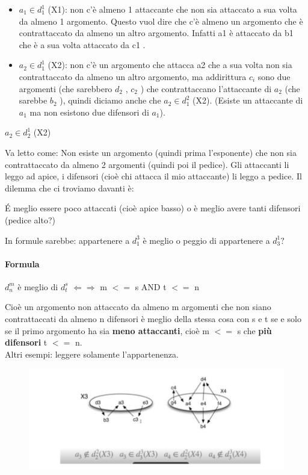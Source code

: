 \begin{itemize}
    \item $a_1 \in d^1_1$ (X1): non c'è almeno 1 attaccante che non sia
          attaccato a sua volta da almeno 1 argomento. Questo vuol dire che c'è
          almeno un argomento che è contrattaccato da almeno un altro argomento.
          Infatti a1 è attaccato da b1 che è a sua volta attaccato da c1 .
    \item $a_2 \in d^1_1$ (X2): non c'è un argomento che attacca a2 che a
          sua volta non sia contrattaccato da almeno un altro argomento, ma
          addirittura $c_i$ sono due argomenti (che sarebbero $d_2$ , $c_2$ ) che
          contrattaccano l'attaccante di $a_2$ (che sarebbe $b_2$ ), quindi
          diciamo anche che $a_2 \in d^2_1$ (X2). (Esiste un attaccante di $a_1$
          ma non esistono due difensori di $a_1$).
\end{itemize}
\begin{center}
    $a_2 \in d^1_2$ (X2)
\end{center}
Va letto come: Non esiste un argomento (quindi prima l'esponente) che non
sia contrattaccato da almeno 2 argomenti (quindi poi il pedice). Gli
attaccanti li leggo ad apice, i difensori (cioè chi attacca il mio
attaccante) li leggo a pedice. Il dilemma che ci troviamo davanti è:
\begin{center}
    É meglio essere poco attaccati (cioè apice basso) o è meglio avere tanti
    difensori (pedice alto?)
\end{center}
In formule sarebbe: appartenere a $d^3_1$ è meglio o peggio di appartenere a
$d^1_3?$

\paragraph{Formula}
\begin{center}
    $d^m_n$ è meglio di $d^s_t$ $\Leftarrow \Rightarrow$ m $<=$ s AND t $<=$
    n
\end{center}
Cioè un argomento non attaccato da almeno m argomenti che non siano
contrattaccati da almeno n difensori è meglio della stessa cosa con s e t se
e solo se il primo argomento ha sia \textbf{meno attaccanti}, cioè m $<=$ s
che \textbf{più difensori} t $<=$ n. \\Altri esempi: leggere solamente
l'appartenenza.
\begin{figure}[H]
    \centering
    \includegraphics[width=12cm, keepaspectratio]{capitoli/img/Cap8/defense2.png}
\end{figure}

